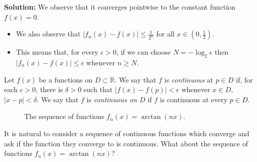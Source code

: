 \noindent
\textbf{Solution:}
We observe that it converges pointwise to the constant function \(f(x)=0\).
\begin{itemize}
  \item We also observe that \(|f_n(x) - f(x) | \leq \frac{1}{2^n}\) for all \(x\in (0,\frac{1}{2})\).
  \item This means that, for every \(\epsilon>0\), if we can choose \(N=-\log_{2}\epsilon\) then \(|f_n(x) - f(x) | \leq \epsilon\) whenever \(n\geq N\).
\end{itemize}


\begin{definition}
  Let \(f(x)\) be a functions on \(D\subset \mathbb{R}\).
  We say that \(f\) is \emph{continuous} at \(p\in D\) if, for each \(\epsilon>0\), there is \(\delta >0\) such that \(|f(x)-f(p)| <\epsilon\) whenever \(x\in D\), \(|x-p| <\delta\).
  We say that \(f\) is \emph{continuous on \( D\)} if \(f\) is continuous at every \(p\in D\).
\end{definition}




\begin{figure}
  \begin{center}
    \caption{The sequence of functions \(f_n(x)= \arctan(nx)\).}
  \end{center}
\end{figure}

It is natural to consider a sequence of continuous functions which converge and ask if the function they converge to is continuous.
What about the sequence of functions \(f_n(x) = \arctan (nx)\)?

